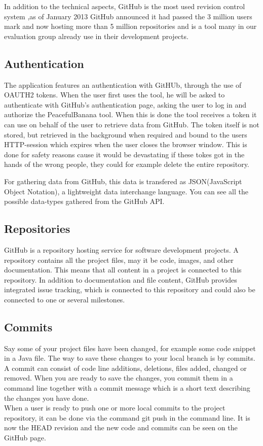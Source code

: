 In addition to the technical aspects, GitHub is the most used revision control system ,as of January 2013 GitHub announced it had passed the 3 million users mark and now hosting more than 5 million repositories and is a tool many in our evaluation group already use in their development projects\citep{githubnumbers}.

\subsection{Authentication}
The application features an authentication with GitHUb, through the use of OAUTH2 tokens. When the user first uses the tool, he will be asked to authenticate with GitHub's authentication page, asking the user to log in and authorize the PeacefulBanana tool. When this is done the tool receives a token it can use on behalf of the user to retrieve data from GitHub. The token itself is not stored, but retrieved in the background when required and bound to the users HTTP-session which expires when the user closes the browser window. This is done for safety reasons cause it would be devastating if these tokes got in the hands of the wrong people, they could for example delete the entire repository.

For gathering data from GitHub, this data is transfered as JSON(JavaScript Object Notation), a lightweight data interchange language. You can see all the possible data-types gathered from the GitHub API.
\subsection{Repositories}
GitHub is a repository hosting service for software development projects. A repository contains all the project files, may it be code, images, and other documentation. This means that all content in a project is connected to this repository. In addition to documentation and file content, GitHub provides integrated issue tracking, which is connected to this repository and could also be connected to one or several milestones. 
\subsection{Commits}
Say some of your project files have been changed, for example some code snippet in a Java file. The way to save these changes to your local branch is by commits. A commit can consist of code line additions, deletions, files added, changed or removed. When you are ready to save the changes, you commit them in a command line together with a commit message which is a short text describing the changes you have done. \\
When a user is ready to push one or more local commits to the project repository, it can be done via the command git push in the command line. It is now the HEAD revision and the new code and commits can be seen on the GitHub page.
